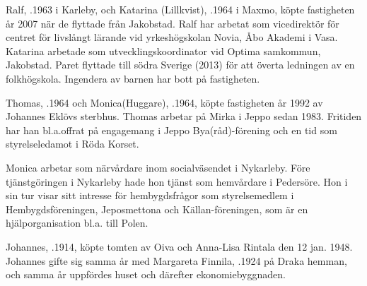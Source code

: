 %
Ralf, .1963 i Karleby, och Katarina (Lillkvist), .1964 i Maxmo, köpte fastigheten år 2007 när de flyttade från Jakobstad. Ralf har arbetat som vicedirektör för centret för livslångt lärande vid yrkeshögskolan Novia, Åbo Akademi i Vasa. Katarina arbetade som utvecklingskoordinator vid Optima samkommun, Jakobstad. Paret flyttade till södra Sverige (2013) för att överta ledningen av en folkhögskola. Ingendera av barnen har bott på fastigheten.
\begin{jhchildren}
  \item {}
  \item {}
  \item {}
  \item {}
  \item {}
\end{jhchildren}


%
Thomas, .1964 och Monica(Huggare), .1964, köpte fastigheten år 1992 av Johannes Eklövs sterbhus. Thomas arbetar på Mirka i Jeppo sedan 1983. Fritiden har han bl.a.offrat på engagemang i Jeppo Bya(råd)-förening och en tid som styrelseledamot i Röda Korset.

Monica arbetar som närvårdare inom socialväsendet i Nykarleby. Före tjänstgöringen i Nykarleby hade hon tjänst som hemvårdare i Pedersöre. Hon i sin tur visar sitt intresse för hembygdsfrågor som styrelsemedlem i Hembygdsföreningen, Jeposmettona och Källan-föreningen, som är en hjälporganisation bl.a. till Polen.
\begin{jhchildren}
  \item {}
  \item {}
  \item {}
\end{jhchildren}


%
Johannes, .1914, köpte tomten av Oiva och Anna-Lisa Rintala den 12 jan. 1948. Johannes gifte sig samma år med Margareta Finnila, .1924 på Draka hemman, och samma år uppfördes huset och därefter ekonomiebyggnaden.

